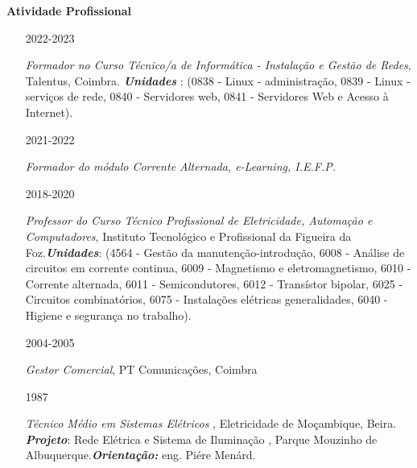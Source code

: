 \documentclass[10pt,a4paper,oneside]{article}
\newlength{\datewidth}
\newlength{\textindent}
\begin{document}
	\vspace{5mm}
	\textbf{\hspace{\textindent}Atividade Profissional}
	\begin{itemize}
		\item[\hspace{\datewidth}\scriptsize 2022-2023] \parbox[t]{\dimexpr\linewidth-\datewidth-\textindent}{\textit{Formador no Curso Técnico/a de Informática - Instalação e Gestão de Redes}, Talentus, Coimbra. \textbf{\textit{Unidades }}: (0838 - Linux - administração,  0839 - Linux - serviços de rede, 0840 - Servidores web, 0841 - Servidores Web e Acesso à Internet).
		}
		\item[\hspace{\datewidth}\scriptsize 2021-2022] \parbox[t]{\dimexpr\linewidth-\datewidth-\textindent}{\textit{Formador do módulo Corrente Alternada, e-Learning, I.E.F.P.}}
		\item[\hspace{\datewidth}\scriptsize 2018-2020] \parbox[t]{\dimexpr\linewidth-\datewidth-\textindent}{\textit{Professor do Curso Técnico Profissional de Eletricidade, Automação e Computadores}, Instituto Tecnológico e Profissional da Figueira da Foz.\textbf{\textit{Unidades}}: (4564 - Gestão da manutenção-introdução, 6008 - Análise de circuitos em corrente continua, 6009 - Magnetismo e eletromagnetismo, 6010 - Corrente alternada,  6011 - Semicondutores, 6012 - Transístor bipolar,  6025 - Circuitos combinatórios,  6075 - Instalações elétricas generalidades, 6040 - Higiene e segurança no trabalho).
		}
		\item[\hspace{\datewidth}\scriptsize 2004-2005] \parbox[t]{\dimexpr\linewidth-\datewidth-\textindent}{\textit{Gestor Comercial},  PT Comunicações, Coimbra}
		\item[\hspace{\datewidth}\scriptsize 1987] \parbox[t]{\dimexpr\linewidth-\datewidth-\textindent}{\textit{Técnico Médio em Sistemas Elétricos },  Eletricidade de Moçambique, Beira. \textbf{\textit{Projeto}}:  Rede Elétrica e Sistema de Iluminação , Parque  Mouzinho de Albuquerque.\textbf{\textit{Orientação:}} eng. Piére Menárd.}
	\end{itemize}
	
\end{document}
